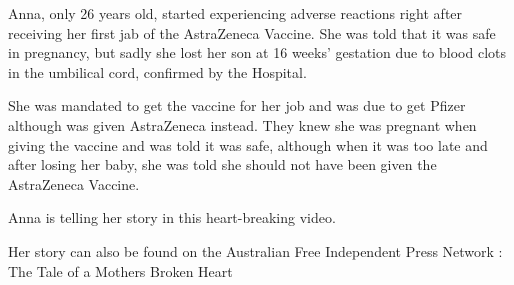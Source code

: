 Anna, only 26 years old, started experiencing adverse reactions right after
receiving her first jab of the AstraZeneca Vaccine. She was told that it was
safe in pregnancy, but sadly she lost her son at 16 weeks’ gestation due to
blood clots in the umbilical cord, confirmed by the Hospital.

She was mandated to get the vaccine for her job and was due to get Pfizer
although was given AstraZeneca instead. They knew she was pregnant when giving
the vaccine and was told it was safe, although when it was too late and after
losing her baby, she was told she should not have been given the AstraZeneca
Vaccine.

Anna is telling her story in this heart-breaking video.

Her story can also be found on the Australian Free Independent Press Network :
The Tale of a Mothers Broken Heart
